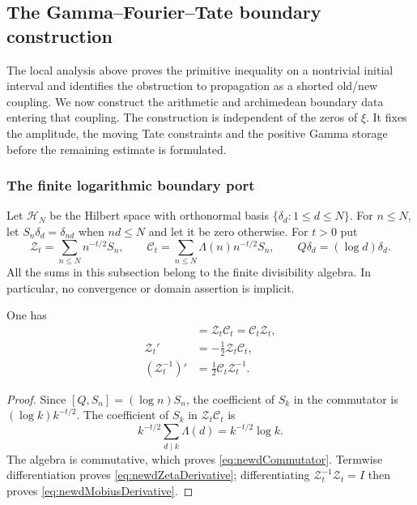 \subsection{The Gamma--Fourier--Tate boundary construction}
\label{ss:gammafouriertate}

The local analysis above proves the primitive inequality on a nontrivial
initial interval and identifies the obstruction to propagation as a shorted
old/new coupling.  We now construct the arithmetic and archimedean boundary
data entering that coupling.  The construction is independent of the zeros
of $\xi$.  It fixes the amplitude, the moving Tate constraints and the
positive Gamma storage before the remaining estimate is formulated.

\subsubsection{The finite logarithmic boundary port}

Let $\mathcal H_N$ be the Hilbert space with orthonormal basis
$\{\delta_d:1\leq d\leq N\}$.  For $n\leq N$, let
$S_n\delta_d=\delta_{nd}$ when $nd\leq N$ and let it be zero otherwise.
For $t>0$ put
\begin{equation}\label{eq:newdZetaConnection}
 \mathscr Z_t=\sum_{n\leq N}n^{-t/2}S_n,
 \qquad
 \mathscr C_t=\sum_{n\leq N}\Lambda(n)n^{-t/2}S_n,
 \qquad Q\delta_d=(\log d)\delta_d.
\end{equation}
All the sums in this subsection belong to the finite divisibility algebra.
In particular, no convergence or domain assertion is implicit.

\begin{lemma}
\label{lem:newdFiniteConnection}
One has
\begin{align}
 [Q,\mathscr Z_t]&=\mathscr Z_t\mathscr C_t
                  =\mathscr C_t\mathscr Z_t,
                  \label{eq:newdCommutator}\\
 \mathscr Z_t'&=-\tfrac12\mathscr Z_t\mathscr C_t,
                  \label{eq:newdZetaDerivative}\\
 (\mathscr Z_t^{-1})'&=\tfrac12\mathscr C_t\mathscr Z_t^{-1}.
                  \label{eq:newdMobiusDerivative}
\end{align}
\end{lemma}

\begin{proof}
Since $[Q,S_n]=(\log n)S_n$, the coefficient of $S_k$ in the
commutator is $(\log k)k^{-t/2}$.  The coefficient of $S_k$ in
$\mathscr Z_t\mathscr C_t$ is
\[
 k^{-t/2}\sum_{d\mid k}\Lambda(d)=k^{-t/2}\log k.
\]
The algebra is commutative, which proves \eqref{eq:newdCommutator}.
Termwise differentiation proves \eqref{eq:newdZetaDerivative};
differentiating $\mathscr Z_t^{-1}\mathscr Z_t=I$ then proves
\eqref{eq:newdMobiusDerivative}.
\end{proof}

